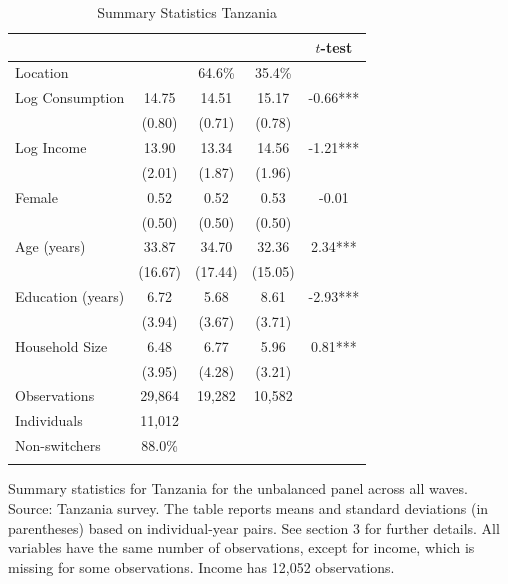 \begin{table}[htbp] \centering \caption{Summary Statistics Tanzania}\label{tab:summary_stats_TZA_unb_2waves} \begin{threeparttable} \begin{tabular}{l cccc} \toprule
 &  &  &  & $t$-test \\
\midrule
Location &  &   64.6\% &   35.4\% &  \\  \addlinespace \addlinespace
Log Consumption & 14.75 & 14.51 & 15.17 & -0.66*** \\
 & (0.80) & (0.71) & (0.78) &  \\  \addlinespace
Log Income & 13.90 & 13.34 & 14.56 & -1.21*** \\
 & (2.01) & (1.87) & (1.96) &  \\  \addlinespace
Female & 0.52 & 0.52 & 0.53 & -0.01 \\
 & (0.50) & (0.50) & (0.50) &  \\  \addlinespace
Age (years) & 33.87 & 34.70 & 32.36 & 2.34*** \\
 & (16.67) & (17.44) & (15.05) &  \\  \addlinespace
Education (years) & 6.72 & 5.68 & 8.61 & -2.93*** \\
 & (3.94) & (3.67) & (3.71) &  \\  \addlinespace
Household Size & 6.48 & 6.77 & 5.96 & 0.81*** \\
 & (3.95) & (4.28) & (3.21) &  \\  \addlinespace


\cmidrule{2-5}
Observations & 29,864 & 19,282 & 10,582 &  \\  \addlinespace
Individuals & 11,012 &  &  &  \\
Non-switchers &   88.0\% &  &  &  \\  \addlinespace
\bottomrule \end{tabular} \begin{tablenotes}[flushleft] \footnotesize \item{Summary statistics for Tanzania for the unbalanced panel across all waves. Source: Tanzania survey. The table reports means and standard deviations (in parentheses) based on individual-year pairs. See section 3 for further details. All variables have the same number of observations, except for income, which is missing for some observations. Income has 12,052 observations.} \end{tablenotes} \end{threeparttable} \end{table}